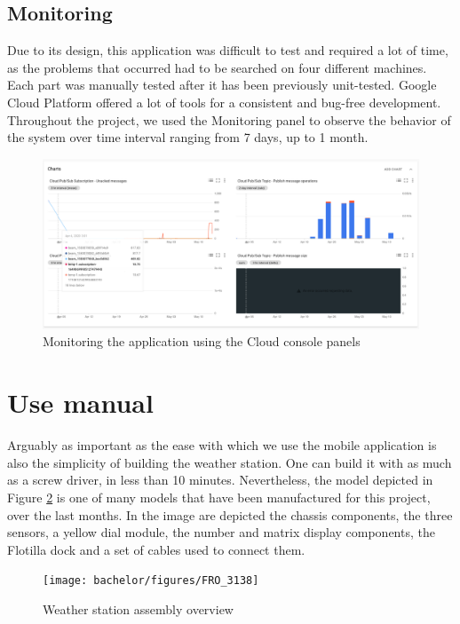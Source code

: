 \subsection*{Monitoring}

Due to its design, this application was difficult to test and required a lot of time, as the problems that occurred had to be searched on four different machines. Each part was manually tested after it has been previously unit-tested. Google Cloud Platform offered a lot of tools for a consistent and bug-free development. Throughout the project, we used the Monitoring panel to observe the behavior of the system over time interval ranging from 7 days, up to 1 month.

\begin{figure}[!htb]
    \centering
    \includegraphics[width = 15.5cm]{figures/testing1}
    \caption{Monitoring the application using the Cloud console panels}
    \label{fig:f1}
\end{figure}

\clearpage
\section{Use manual}

Arguably as important as the ease with which we use the mobile application is also the simplicity of building the weather station. One can build it with as much as a screw driver, in less than 10 minutes. Nevertheless, the model depicted in Figure \ref{fig:weather_station_pres} is one of many models that have been manufactured for this project, over the last months. In the image are depicted the chassis components, the three sensors, a yellow dial module, the number and matrix display components, the Flotilla dock and a set of cables used to connect them.

\begin{figure}[!htb]
    \centering
    \texttt{[image: bachelor/figures/FRO\_3138]}
    \caption{Weather station assembly overview}
    \label{fig:weather_station_pres}
\end{figure}

